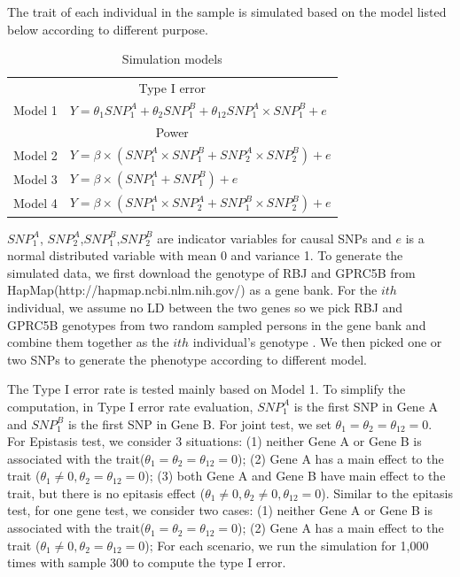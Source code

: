 \documentclass{article}
\begin{document}
        The trait of each individual in the sample is simulated based on the model listed below according to different purpose.
        \begin{table}[htbp]
            \centering
            \caption{Simulation models}
            \begin{tabular}{c|l}
                \toprule
                \multicolumn{2}{c}{Type I error}\\
                 Model 1 & $Y = \theta_1SNP^A_1+\theta_2SNP^B_1+\theta_{12}SNP^A_1\times SNP^B_1 +e$\\
                \midrule
                \multicolumn{2}{c}{Power}\\
                Model 2 & $Y =\beta\times (SNP^A_1\times SNP^B_1+SNP^A_2\times SNP^B_2)+e$  \\
                Model 3 & $Y =\beta\times (SNP^A_1+SNP^B_1)+e$\\
                Model 4 & $Y =\beta\times (SNP^A_1\times SNP^A_2+SNP^B_1\times SNP^B_2)+e$\\
                \bottomrule
            \end{tabular}
        \end{table}
        $SNP^A_1$, $SNP^A_2$,$SNP^B_1$,$SNP^B_2$ are indicator variables for causal SNPs and $e$ is a normal distributed variable with mean 0 and variance 1. To generate the simulated data, we first download the genotype of RBJ and GPRC5B from HapMap(http://hapmap.ncbi.nlm.nih.gov/) as a gene bank. For the $ith$ individual, we assume no LD between the two genes so we pick RBJ and GPRC5B genotypes from two random sampled persons in the gene bank and combine them together as the $ith$ individual's genotype . We then picked one or two SNPs to generate the phenotype according to different model.
         
        The Type I error rate is tested mainly based on Model 1. To simplify the computation, in Type I error rate evaluation, $SNP^A_1$ is the first SNP in Gene A and $SNP^B_1$ is the first SNP in Gene B. For joint test, we set $\theta_1=\theta_2=\theta_{12}=0$. For Epistasis test, we consider 3 situations: (1) neither Gene A or Gene B is associated with the trait($\theta_1=\theta_2=\theta_{12}=0$); (2) Gene A has a main effect to the trait ($\theta_1\neq0,\theta_2=\theta_{12}=0$); (3) both Gene A and Gene B have main effect to the trait, but there is no epitasis effect ($\theta_1\neq0,\theta_2\neq0,\theta_{12}=0$). Similar to the epitasis test, for one gene test, we consider two cases: (1) neither Gene A or Gene B is associated with the trait($\theta_1=\theta_2=\theta_{12}=0$); (2) Gene A has a main effect to the trait ($\theta_1\neq0,\theta_2=\theta_{12}=0$); For each scenario, we run the simulation for 1,000 times with sample 300 to compute the type I error.
\end{document}
